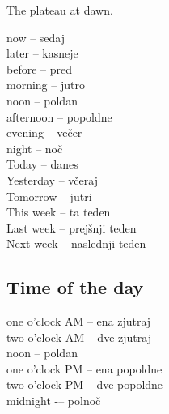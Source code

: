 \begin{marginfigure}
\checkoddpage \ifoddpage \forcerectofloat \else \forceversofloat \fi
\centering
 \caption{The plateau at dawn. }
 \label{rain}
\end{marginfigure}

now -- sedaj\\
later -- kasneje\\
before -- pred\\
morning -- jutro\\
noon -- poldan\\
afternoon -- popoldne\\
evening -- večer\\
night -- noč\\
Today -- danes\\
Yesterday -- včeraj\\
Tomorrow -- jutri\\
This week -- ta teden\\
Last week -- prejšnji teden\\
Next week -- naslednji teden\\

\subsection{Time of the day}

one o'clock AM -- ena zjutraj\\
two o'clock AM -- dve zjutraj\\
noon -- poldan\\
one o'clock PM -- ena popoldne\\
two o'clock PM -- dve popoldne\\
midnight -– polnoč\\

